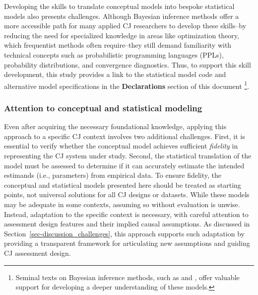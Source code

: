\documentclass[
  authoryear,
  review,
  1p]{elsarticle}
\begin{document}
Developing the skills to translate conceptual models into bespoke
statistical models also presents challenges. Although Bayesian inference
methods offer a more accessible path for many applied CJ researchers to
develop these skills--by reducing the need for specialized knowledge in
areas like optimization theory, which frequentist methods often
require--they still demand familiarity with technical concepts such as
probabilistic programming languages (PPLs), probability distributions,
and convergence diagnostics. Thus, to support this skill development,
this study provides a link to the statistical model code and alternative
model specifications in the \textbf{Declarations} section of this
document \footnote{Seminal texts on Bayesian inference methods, such as
  \citet{Gelman_et_al_2014} and \citet{McElreath_2020}, offer valuable
  support for developing a deeper understanding of these models.}.

\subsubsection{Attention to conceptual and statistical
modeling}\label{sec-discussion_challenges2}

Even after acquiring the necessary foundational knowledge, applying this
approach to a specific CJ context involves two additional challenges.
First, it is essential to verify whether the conceptual model achieves
sufficient \emph{fidelity} in representing the CJ system under study.
Second, the statistical translation of the model must be assessed to
determine if it can accurately estimate the intended estimands (i.e.,
parameters) from empirical data. To ensure fidelity, the conceptual and
statistical models presented here should be treated as starting points,
not universal solutions for all CJ designs or datasets. While these
models may be adequate in some contexts, assuming so without evaluation
is unwise. Instead, adaptation to the specific context is necessary,
with careful attention to assessment design features and their implied
causal assumptions. As discussed in
Section~\ref{sec-discussion_challenges}, this approach supports such
adaptation by providing a transparent framework for articulating new
assumptions and guiding CJ assessment design.
\end{document}
